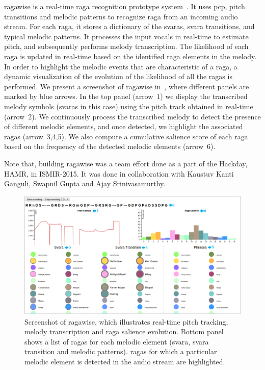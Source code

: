 \gls{ragawise} is a real-time \gls{raga} recognition prototype system~\citep{ragawise}. It uses \gls{pcp}, pitch transitions and melodic patterns to recognize \gls{raga} from an incoming audio stream. For each \gls{raga}, it stores a dictionary of the \glspl{svara}, \gls{svara} transitions, and typical melodic patterns. It processes the input vocals in real-time to estimate pitch, and subsequently performs melody transcription. The likelihood of each \gls{raga} is updated in real-time based on the identified \gls{raga} elements in the melody. In order to highlight the melodic events that are characteristic of a \gls{raga}, a dynamic visualization of the evolution of the likelihood of all the \glspl{raga} is performed. We present a screenshot of \gls{ragawise} in~, where different panels are marked by blue arrows. In the top panel (arrow~1) we display the transcribed melody symbols (\glspl{svara} in this case) using the pitch track obtained in real-time (arrow~2). We continuously process the transcribed melody to detect the presence of different melodic elements, and once detected, we highlight the associated \glspl{raga} (arrow~3,4,5). We also compute a cumulative salience score of each \gls{raga} based on the frequency of the detected melodic elements (arrow~6).

Note that, building \gls{ragawise} was a team effort done as a part of the Hackday, HAMR, in ISMIR-2015. It was done in collaboration with Kaustuv Kanti Ganguli, Swapnil Gupta and Ajay Srinivasamurthy. 

\begin{figure}
	\begin{center}
		\includegraphics[width=\figSizeHundred]{ch08_applications/figures/ragawise.pdf}
	\end{center}
	\caption[Screenshot of \gls{ragawise}]{Screenshot of \gls{ragawise}, which illustrates real-time pitch tracking, melody transcription and \gls{raga} salience evolution. Bottom panel shows a list of \glspl{raga} for each melodic element (\gls{svara}, \gls{svara} transition and melodic patterns). \Glspl{raga} for which a particular melodic element is detected in the audio stream are highlighted.}
	\label{fig:ragawise}
\end{figure}


